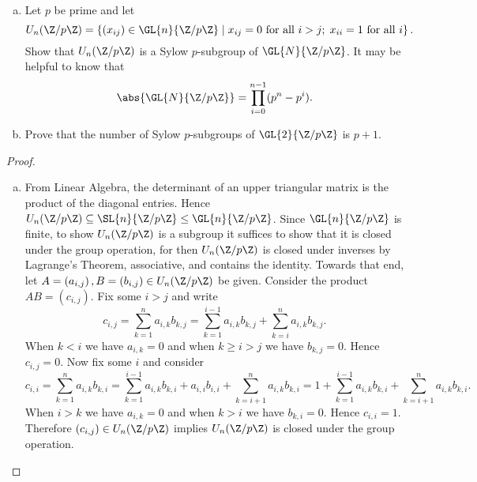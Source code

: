 \documentclass[10pt]{amsart}
\begin{document}
\begin{thm}
  \begin{enumerate}[(a)]
  \item
    Let $p$ be prime and let 
    $$U_n(\Z/p\Z) = \left\{(x_{ij}) \in \GL{n}{\Z/p\Z} \;\middle\vert\; x_{ij} = 0 \text{ for all } i > j;\; x_{ii} = 1 \text{ for all } i \right\}.$$
    Show that $U_n(\Z/p\Z)$ is a Sylow $p$-subgroup of $\GL{N}{\Z/p\Z}$.
    It may be helpful to know that 
    $$\abs{\GL{N}{\Z/p\Z}} = \prod_{i=0}^{n-1}(p^n - p^i).$$
  \item
    Prove that the number of Sylow $p$-subgroups of $\GL{2}{\Z/p\Z}$ is $p + 1$.
  \end{enumerate}
  \begin{proof}
    \begin{enumerate}[(a)]
    \item
      From Linear Algebra, the determinant of an upper triangular matrix is the product of the diagonal entries.
      Hence $U_n(\Z/p\Z) \subseteq \SL{n}{\Z/p\Z} \leq \GL{n}{\Z/p\Z}$.
      Since $\GL{n}{\Z/p\Z}$ is finite, to show $U_n(\Z/p\Z)$ is a subgroup it suffices to show that it is closed under the group operation, for then $U_n(\Z/p\Z)$ is closed under inverses by Lagrange's Theorem, associative, and contains the identity.
      Towards that end, let $A = \left(a_{i,j}\right), B = \left(b_{i,j}\right) \in U_n(\Z/p\Z)$ be given.
      Consider the product $AB = \left(c_{i,j}\right)$.
      Fix some $i > j$ and write $$c_{i,j} = \sum_{k=1}^n a_{i,k}b_{k,j} = \sum_{k=1}^{i-1}a_{i,k}b_{k,j} + \sum_{k=i}^n a_{i,k}b_{k,j}.$$
      When $k < i$ we have $a_{i,k} = 0$ and when $k \geq i > j$ we have $b_{k,j} = 0$.
      Hence $c_{i,j} = 0$.
      Now fix some $i$ and consider 
      $$c_{i,i} = \sum_{k=1}^n a_{i,k}b_{k,i} = \sum_{k=1}^{i-1} a_{i,k}b_{k,i} + a_{i,i}b_{i,i} + \sum_{k=i+1}^n a_{i,k}b_{k,i} = 1 + \sum_{k=1}^{i-1} a_{i,k}b_{k,i} + \sum_{k=i+1}^n a_{i,k}b_{k,i}.$$
      When $i > k$ we have $a_{i,k} = 0$ and when $k > i$ we have $b_{k,i} = 0$.
      Hence $c_{i,i} = 1$.
      Therefore $(c_{i,j}) \in U_n(\Z/p\Z)$ implies $U_n(\Z/p\Z)$ is closed under the group operation.
      

\end{enumerate}
\end{proof}
\end{thm}
\end{document}
